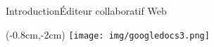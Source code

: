 \begin{frame}{Introduction}{Éditeur collaboratif Web}
    


    \begin{textblock*}{\textwidth}(-0.8cm,-2cm) 
    \texttt{[image: img/googledocs3.png]}
  \end{textblock*}
\end{frame}


